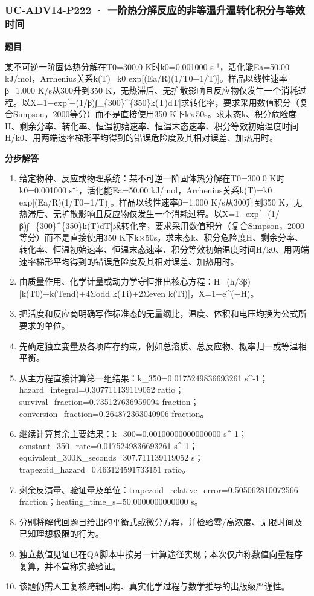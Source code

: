 \documentclass[UTF8,11pt,a4paper]{ctexart}
\begin{document}
\subsubsection*{UC-ADV14-P222 · 一阶热分解反应的非等温升温转化积分与等效时间}
\noindent\textbf{题目}\par
某不可逆一阶固体热分解在T0=300.0 K时k0=0.001000 s⁻¹，活化能Ea=50.00 kJ/mol，Arrhenius关系k(T)=k0 exp[(Ea/R)(1/T0−1/T)]。样品以线性速率β=1.000 K/s从300升到350 K，无热滞后、无扩散影响且反应物仅发生一个消耗过程。以X=1−exp[−(1/β)∫\_\{300\}\textasciicircum{}\{350\}k(T)dT]求转化率，要求采用数值积分（复合Simpson，2000等分）而不是直接使用350 K下k×50s。求末态k、积分危险度H、剩余分率、转化率、恒温初始速率、恒温末态速率、积分等效初始温度时间H/k0、用两端速率梯形平均得到的错误危险度及其相对误差、加热用时。\par
\medskip\noindent\textbf{分步解答}
\begin{enumerate}
\item 给定物种、反应或物理系统：某不可逆一阶固体热分解在T0=300.0 K时k0=0.001000 s⁻¹，活化能Ea=50.00 kJ/mol，Arrhenius关系k(T)=k0 exp[(Ea/R)(1/T0−1/T)]。样品以线性速率β=1.000 K/s从300升到350 K，无热滞后、无扩散影响且反应物仅发生一个消耗过程。以X=1−exp[−(1/β)∫\_\{300\}\textasciicircum{}\{350\}k(T)dT]求转化率，要求采用数值积分（复合Simpson，2000等分）而不是直接使用350 K下k×50s。求末态k、积分危险度H、剩余分率、转化率、恒温初始速率、恒温末态速率、积分等效初始温度时间H/k0、用两端速率梯形平均得到的错误危险度及其相对误差、加热用时。
\item 由质量作用、化学计量或动力学守恒推出核心方程：H=(h/3β)[k(T0)+k(Tend)+4Σodd k(Ti)+2Σeven k(Ti)]，X=1−e\textasciicircum{}(−H)。
\item 把活度和反应商明确写作标准态的无量纲比，温度、体积和电压均换为公式所要求的单位。
\item 先确定独立变量及各项库存约束，例如总溶质、总反应物、概率归一或等温相平衡。
\item 从主方程直接计算第一组结果：k\_350=0.0175249836693261 s\textasciicircum{}-1；hazard\_integral=0.307711139119052 ratio；survival\_fraction=0.735127636959094 fraction；conversion\_fraction=0.264872363040906 fraction。
\item 继续计算其余主要结果：k\_300=0.00100000000000000 s\textasciicircum{}-1；constant\_350\_rate=0.0175249836693261 s\textasciicircum{}-1；equivalent\_300K\_seconds=307.711139119052 s；trapezoid\_hazard=0.463124591733151 ratio。
\item 剩余反演量、验证量及单位：trapezoid\_relative\_error=0.505062810072566 fraction；heating\_time\_s=50.0000000000000 s。
\item 分别将解代回题目给出的平衡式或微分方程，并检验零/高浓度、无限时间及已知理想极限的行为。
\item 独立数值见证已在QA脚本中按另一计算途径实现；本次仅声称数值向量程序复算，并不宣称实验验证。
\item 该题仍需人工复核跨辑同构、真实化学过程与数学推导的出版级严谨性。
\end{enumerate}
\end{document}

